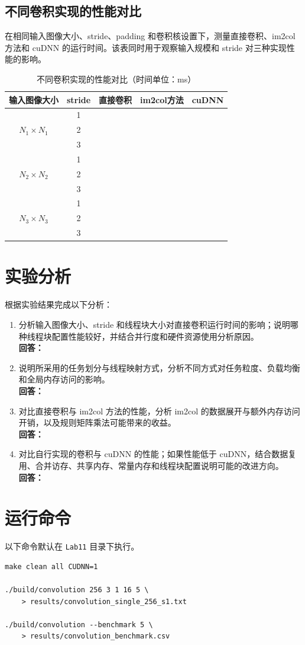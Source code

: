 \documentclass{SYSUReport}
\begin{document}
\subsection{不同卷积实现的性能对比}
在相同输入图像大小、stride、padding 和卷积核设置下，测量直接卷积、im2col 方法和 cuDNN 的运行时间。该表同时用于观察输入规模和 stride 对三种实现性能的影响。
\begin{table}[H]
\centering
\caption{不同卷积实现的性能对比（时间单位：ms）}
\label{tab:conv_compare}
\begin{tabular}{|c|c|c|c|c|}
\hline
输入图像大小 & stride & 直接卷积 & im2col方法 & cuDNN \\
\hline
\multirow{3}{*}{$N_1\times N_1$}
& 1 & & & \\
\cline{2-5}
& 2 & & & \\
\cline{2-5}
& 3 & & & \\
\hline
\multirow{3}{*}{$N_2\times N_2$}
& 1 & & & \\
\cline{2-5}
& 2 & & & \\
\cline{2-5}
& 3 & & & \\
\hline
\multirow{3}{*}{$N_3\times N_3$}
& 1 & & & \\
\cline{2-5}
& 2 & & & \\
\cline{2-5}
& 3 & & & \\
\hline
\end{tabular}
\end{table}

\section{实验分析}
根据实验结果完成以下分析：
\begin{enumerate}
    \item 分析输入图像大小、stride 和线程块大小对直接卷积运行时间的影响；说明哪种线程块配置性能较好，并结合并行度和硬件资源使用分析原因。\\
    \textbf{回答：}

    \item 说明所采用的任务划分与线程映射方式，分析不同方式对任务粒度、负载均衡和全局内存访问的影响。\\
    \textbf{回答：}

    \item 对比直接卷积与 im2col 方法的性能，分析 im2col 的数据展开与额外内存访问开销，以及规则矩阵乘法可能带来的收益。\\
    \textbf{回答：}

    \item 对比自行实现的卷积与 cuDNN 的性能；如果性能低于 cuDNN，结合数据复用、合并访存、共享内存、常量内存和线程块配置说明可能的改进方向。\\
    \textbf{回答：}
\end{enumerate}

\appendix
\section{运行命令}
\noindent 以下命令默认在 \texttt{Lab11} 目录下执行。

\begin{verbatim}
make clean all CUDNN=1

./build/convolution 256 3 1 16 5 \
    > results/convolution_single_256_s1.txt

./build/convolution --benchmark 5 \
    > results/convolution_benchmark.csv
\end{verbatim}
\end{document}
